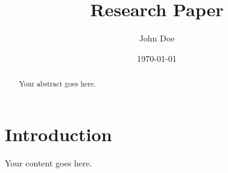 \documentclass{article}
\title{Research Paper}
\author{John Doe}
\date{\today}
\begin{document}
\maketitle

\begin{abstract}
Your abstract goes here.
\end{abstract}

\section{Introduction}

Your content goes here.
\end{document}
